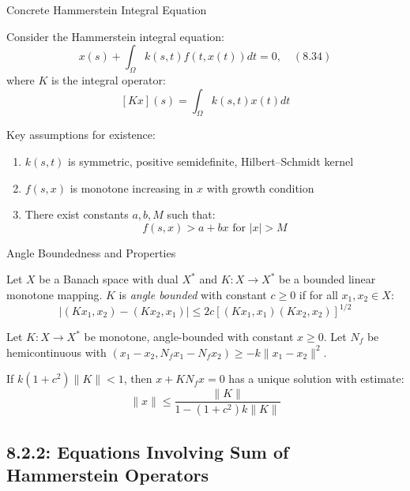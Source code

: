 \documentclass[aspectratio=169,10pt]{beamer}
\begin{document}
\begin{frame}[fragile]{Concrete Hammerstein Integral Equation}
    \begin{example}[Example 8.6]
        Consider the Hammerstein integral equation:
        \[
            x(s) + \int_{\Omega} k(s, t) f(t, x(t)) dt = 0, \quad (8.34)
        \]
        where $K$ is the integral operator:
        \[
            [Kx](s) = \int_{\Omega} k(s,t) x(t) dt
        \]
    \end{example}

    \vspace{0.3cm}
    Key assumptions for existence:
    \begin{enumerate}
        \item $k(s,t)$ is symmetric, positive semidefinite, Hilbert--Schmidt kernel
        \item $f(s,x)$ is monotone increasing in $x$ with growth condition
        \item There exist constants $a, b, M$ such that:
            \[
                f(s,x) > a + bx \text{ for } |x| > M
            \]
    \end{enumerate}
\end{frame}

\begin{frame}{Angle Boundedness and Properties}
    \begin{definition}
        Let $X$ be a Banach space with dual $X^*$ and $K : X \to X^*$ be a bounded
        linear monotone mapping. $K$ is \emph{angle bounded} with constant $c \geq 0$ if
        for all $x_1, x_2 \in X$:
        \[
            |(Kx_1, x_2) - (Kx_2, x_1)| \leq 2c[(Kx_1, x_1)(Kx_2, x_2)]^{1/2}
        \]
    \end{definition}

    \vspace{0.3cm}
    \begin{theorem}
        Let $K : X \to X^*$ be monotone, angle-bounded with constant $x \geq 0$.
        Let $N_f$ be hemicontinuous with $(x_1 - x_2, N_f x_1 - N_f x_2) \geq -k\|x_1 - x_2\|^2$.

        If $k(1 + c^2)\|K\| < 1$, then $x + KN_f x = 0$ has a unique solution
        with estimate:
        \[
            \|x\| \leq \frac{\|K\|}{1-(1+c^2)k\|K\|}
        \]
    \end{theorem}
\end{frame}

\subsection{8.2.2: Equations Involving Sum of Hammerstein Operators}
\end{document}
